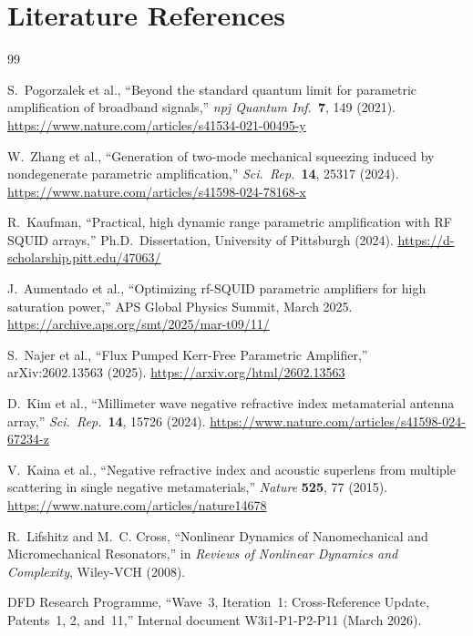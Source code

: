 \documentclass[11pt,twocolumn]{article}
\begin{document}
\section*{Literature References}

\begin{thebibliography}{99}

S.~Pogorzalek et al.,
``Beyond the standard quantum limit for parametric amplification of broadband signals,''
\textit{npj Quantum Inf.}\ \textbf{7}, 149 (2021).
\url{https://www.nature.com/articles/s41534-021-00495-y}

W.~Zhang et al.,
``Generation of two-mode mechanical squeezing induced by nondegenerate parametric amplification,''
\textit{Sci.\ Rep.}\ \textbf{14}, 25317 (2024).
\url{https://www.nature.com/articles/s41598-024-78168-x}

R.~Kaufman,
``Practical, high dynamic range parametric amplification with RF SQUID arrays,''
Ph.D.\ Dissertation, University of Pittsburgh (2024).
\url{https://d-scholarship.pitt.edu/47063/}

J.~Aumentado et al.,
``Optimizing rf-SQUID parametric amplifiers for high saturation power,''
APS Global Physics Summit, March 2025.
\url{https://archive.aps.org/smt/2025/mar-t09/11/}

S.~Najer et al.,
``Flux Pumped Kerr-Free Parametric Amplifier,''
arXiv:2602.13563 (2025).
\url{https://arxiv.org/html/2602.13563}

D.~Kim et al.,
``Millimeter wave negative refractive index metamaterial antenna array,''
\textit{Sci.\ Rep.}\ \textbf{14}, 15726 (2024).
\url{https://www.nature.com/articles/s41598-024-67234-z}

V.~Kaina et al.,
``Negative refractive index and acoustic superlens from multiple scattering in single negative metamaterials,''
\textit{Nature} \textbf{525}, 77 (2015).
\url{https://www.nature.com/articles/nature14678}

R.~Lifshitz and M.~C. Cross,
``Nonlinear Dynamics of Nanomechanical and Micromechanical Resonators,''
in \textit{Reviews of Nonlinear Dynamics and Complexity}, Wiley-VCH (2008).

DFD Research Programme,
``Wave~3, Iteration~1: Cross-Reference Update, Patents~1, 2, and~11,''
Internal document W3i1-P1-P2-P11 (March 2026).

\end{thebibliography}
\end{document}
